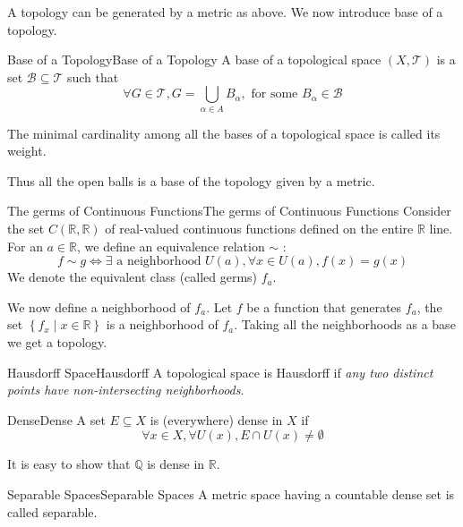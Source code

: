 \documentclass[../main.tex]{subfiles}
\begin{document}
A topology can be generated by a metric as above. We now introduce base of a topology.
\begin{definition}{Base of a Topology}{Base of a Topology}
A base of a topological space $(X,\mathcal{T})$ is a set $\mathcal{B} \subseteq \mathcal{T}$ such that
\begin{equation*}
\forall G\in \mathcal{T}, G = \bigcup_{\alpha\in A}B_{\alpha}, \text{ for some }B_{\alpha}\in \mathcal{B} 
\end{equation*}

The minimal cardinality among all the bases of a topological space is called its weight.
\end{definition}

Thus all the open balls is a base of the topology given by a metric.

\begin{example}{The germs of Continuous Functions}{The germs of Continuous Functions}
Consider the set $C(\mathbb{R},\mathbb{R})$ of real-valued continuous functions defined on the entire $\mathbb{R}$ line. For an $a\in \mathbb{R}$, we define an equivalence relation $\sim$ :
\begin{equation}
f\sim g \Leftrightarrow  \exists \text{ a neighborhood }U(a),\forall x\in U(a), f(x)=g(x)
\end{equation}
We denote the equivalent class (called germs) $f_a$.

We now define a neighborhood of $f_a$. Let $f$ be a function that generates $f_a$, the set $\left\{ f_x \mid x\in \mathbb{R} \right\}$ is a neighborhood of $f_a$. Taking all the neighborhoods as a base we get a topology.
\end{example}

\begin{definition}{Hausdorff Space}{Hausdorff}
A topological space is Hausdorff if \emph{any two distinct points have non-intersecting neighborhoods}.
\end{definition}
\begin{definition}{Dense}{Dense}
A set $E \subseteq X$ is (everywhere) dense in $X$ if
\begin{equation*}
\forall x\in X, \forall U(x), E\cap U(x) \neq \emptyset 
\end{equation*}
\end{definition}
It is easy to show that $\mathbb{Q}$ is dense in $\mathbb{R}$.

\begin{definition}{Separable Spaces}{Separable Spaces}
A metric space having a countable dense set is called separable.
\end{definition}
\end{document}
